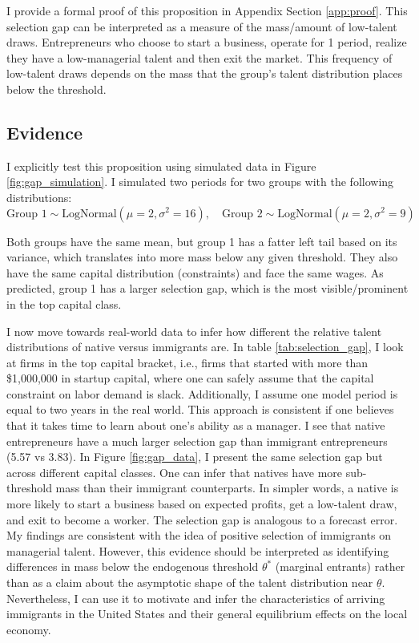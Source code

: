     I provide a formal proof of this proposition in Appendix Section \ref{app:proof}. This selection gap can be interpreted as a measure of the mass/amount of low-talent draws. Entrepreneurs who choose to start a business, operate for 1 period, realize they have a low-managerial talent and then exit the market. This frequency of low-talent draws depends on the mass that the group's talent distribution places below the threshold.

    \subsection{Evidence}
    
    I explicitly test this proposition using simulated data in Figure \ref{fig:gap_simulation}. I simulated two periods for two groups with the following distributions:
    \[\text{Group 1} \sim \text{LogNormal}(\mu = 2, \sigma^2 = 16), \quad \text{Group 2} \sim \text{LogNormal}(\mu = 2, \sigma^2 = 9)\]

    Both groups have the same mean, but group 1 has a fatter left tail based on its variance, which translates into more mass below any given threshold. They also have the same capital distribution (constraints) and face the same wages. As predicted, group 1 has a larger selection gap, which is the most visible/prominent in the top capital class.

    I now move towards real-world data to infer how different the relative talent distributions of native versus immigrants are. In table \ref{tab:selection_gap}, I look at firms in the top capital bracket, i.e., firms that started with more than \$1,000,000 in startup capital, where one can safely assume that the capital constraint on labor demand is slack. Additionally, I assume one model period is equal to two years in the real world. This approach is consistent if one believes that it takes time to learn about one's ability as a manager. I see that native entrepreneurs have a much larger selection gap than immigrant entrepreneurs (5.57 vs 3.83). In Figure \ref{fig:gap_data}, I present the same selection gap but across different capital classes. One can infer that natives have more sub-threshold mass than their immigrant counterparts. In simpler words, a native is more likely to start a business based on expected profits, get a low-talent draw, and exit to become a worker. The selection gap is analogous to a forecast error. My findings are consistent with the idea of positive selection of immigrants on managerial talent. However, this evidence should be interpreted as identifying differences in mass below the endogenous threshold $\theta^{*}$ (marginal entrants) rather than as a claim about the asymptotic shape of the talent distribution near $\underline{\theta}$. Nevertheless, I can use it to motivate and infer the characteristics of arriving immigrants in the United States and their general equilibrium effects on the local economy.